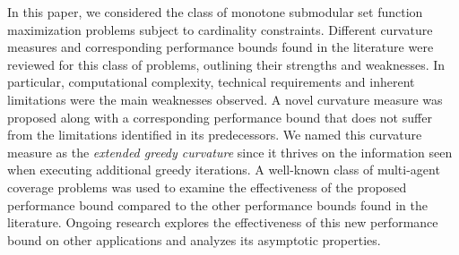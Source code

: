 \documentclass[conference]{IEEEtran}
\begin{document}
In this paper, we considered the class of monotone submodular set function maximization problems subject to cardinality constraints. Different curvature measures and corresponding performance bounds found in the literature were reviewed for this class of problems, outlining their strengths and weaknesses. In particular, computational complexity, technical requirements and inherent limitations were the main weaknesses observed. A novel curvature measure was proposed along with a corresponding performance bound that does not suffer from the limitations identified in its predecessors. We named this curvature measure as the \emph{extended greedy curvature} since it thrives on the information seen when executing additional greedy iterations. A well-known class of multi-agent coverage problems was used to examine the effectiveness of the proposed performance bound compared to the other performance bounds found in the literature.  Ongoing research explores the effectiveness of this new performance bound on other applications and analyzes its asymptotic properties.












\end{document}
